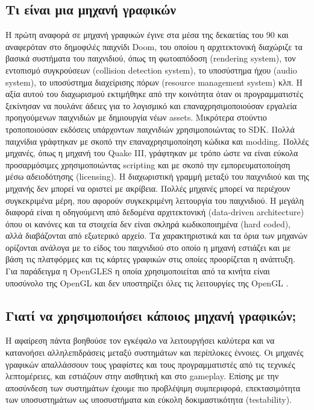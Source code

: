 	\subsection {Τι είναι μια μηχανή γραφικών}
	Η πρώτη αναφορά σε μηχανή γραφικών έγινε στα μέσα της δεκαετίας του 90 και αναφερόταν στο δημοφιλές παιχνίδι Doom, του οποίου η αρχιτεκτονική διαχώριζε τα βασικά συστήματα του παιχνιδιού, όπως τη φωτοαπόδοση (rendering system), τον εντοπισμό συγκρούσεων (collision detection system), το υποσύστημα ήχου (audio system), το υποσύστημα διαχείρισης πόρων (resource management system) κλπ. Η αξία αυτού του διαχωρισμού εκτιμήθηκε από την κοινότητα όταν οι προγραμματιστές ξεκίνησαν να πουλάνε άδειες για το λογισμικό και επαναχρησιμοποιούσαν εργαλεία προηγούμενων παιχνιδιών με δημιουργία νέων \gls{assets}. Μικρότερα στούντιο τροποποιούσαν εκδόσεις υπάρχοντων παιχνιδιών χρησιμοποιώντας το \gls{SDK}.
	Πολλά παιχνίδια γράφτηκαν με σκοπό την επαναχρησιμοποίηση κώδικα και \gls{modding}. Πολλές μηχανές, όπως η μηχανή του Quake III, γράφτηκαν με τρόπο ώστε να είναι εύκολα προσαρμόσιμες χρησιμοποιώντας scripting και με σκοπό την εμπορευματοποίηση μέσω αδειοδότησης (licensing).
	Η διαχωριστική γραμμή μεταξύ του παιχνιδιού και της μηχανής δεν μπορεί να οριστεί με ακρίβεια. Πολλές μηχανές μπορεί να περιέχουν συγκεκριμένα μέρη, που αφορούν συγκεκριμένη λειτουργία του παιχνιδιού. Η μεγάλη διαφορά είναι η οδηγούμενη από δεδομένα αρχιτεκτονική (data-driven architecture) όπου οι κανόνες και τα στοιχεία δεν είναι σκληρά κωδικοποιημένα (hard coded), αλλά διαβάζονται από εξωτερικό αρχείο.
	Τα χαρακτηριστικά και τα όρια των μηχανών ορίζονται ανάλογα με το είδος του παιχνιδιού στο οποίο η μηχανή εστιάζει και με βάση τις πλατφόρμες και τις κάρτες γραφικών στις οποίες προορίζεται η ανάπτυξη. Για παράδειγμα η \gls{OpenGLES} η οποία χρησιμοποιείται από τα κινήτα είναι υποσύνολο της \gls{OpenGL} και δεν υποστηρίζει όλες τις λειτουργίες της \gls{OpenGL} \cite{opengleslimitations}.
	
	\subsection{Γιατί να χρησιμοποιήσει κάποιος μηχανή γραφικών;}	
	Η αφαίρεση πάντα βοηθούσε τον εγκέφαλο να λειτουργήσει καλύτερα και να κατανοήσει αλληλεπιδράσεις μεταξύ συστημάτων και περίπλοκες έννοιες. Οι μηχανές γραφικών απαλλάσσουν τους γραφίστες και τους προγραμματιστές από τις τεχνικές λεπτομέρειες, και εστιάζουν στην αισθητική και στο gameplay. Επίσης με την αποσύνδεση των συστημάτων έχουμε πιο προβλέψιμη συμπεριφορά, επεκτασιμότητα των υποσυστημάτων ως υποσυστήματα και εύκολη δοκιμαστικότητα (testability).
	

